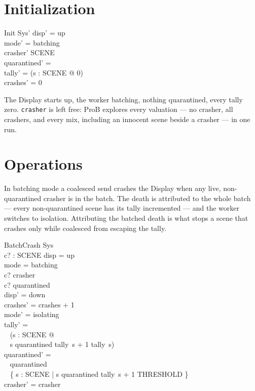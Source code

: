 \documentclass[a4paper,10pt,fleqn]{article}
\begin{document}
\section{Initialization}

\begin{schema}{Init}
  Sys'
\where
  disp' = up \\
  mode' = batching \\
  crasher' \subseteq SCENE \\
  quarantined' = \emptyset \\
  tally' = (\lambda s : SCENE @ 0) \\
  crashes' = 0
\end{schema}

The Display starts up, the worker batching, nothing quarantined, every tally
zero.  \texttt{crasher} is left free: ProB explores every valuation --- no
crasher, all crashers, and every mix, including an innocent scene beside a
crasher --- in one run.

\section{Operations}

In batching mode a coalesced send crashes the Display when any live,
non-quarantined crasher is in the batch.  The death is attributed to the whole
batch --- every non-quarantined scene has its tally incremented --- and the
worker switches to isolation.  Attributing the batched death is what stops a
scene that crashes only while coalesced from escaping the tally.

\begin{schema}{BatchCrash}
  \Delta Sys \\
  c? : SCENE
\where
  disp = up \\
  mode = batching \\
  c? \in crasher \\
  c? \notin quarantined \\
  disp' = down \\
  crashes' = crashes + 1 \\
  mode' = isolating \\
  tally' = \\
  \quad~ (\lambda s : SCENE @ \\
  \quad\quad~ \IF s \notin quarantined \THEN tally~s + 1 \ELSE tally~s) \\
  quarantined' = \\
  \quad~ quarantined \cup \\
  \quad\quad~ \{ s : SCENE | s \notin quarantined \land tally~s + 1 \geq THRESHOLD \} \\
  crasher' = crasher
\end{schema}
\end{document}
